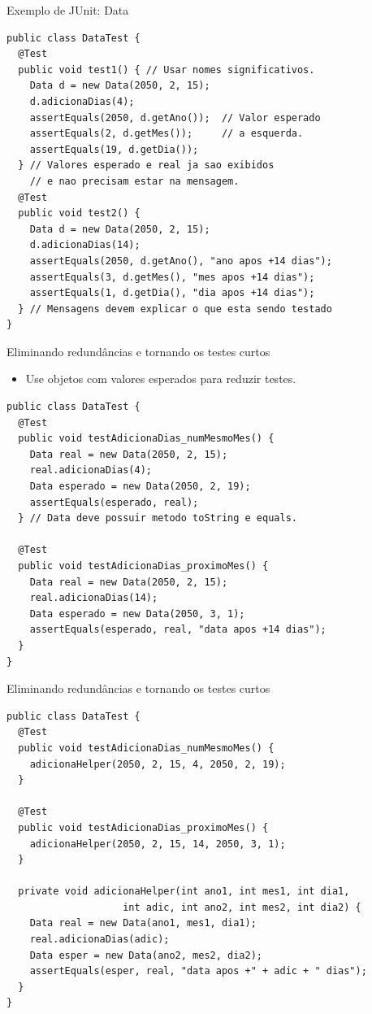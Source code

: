 \documentclass[handout]{beamer}
\begin{document}
\begin{frame}[fragile]{Exemplo de JUnit: Data}
\vspace{-2mm}
\begin{lstlisting}
public class DataTest {
  @Test
  public void test1() { // Usar nomes significativos.
    Data d = new Data(2050, 2, 15);
    d.adicionaDias(4);
    assertEquals(2050, d.getAno());  // Valor esperado
    assertEquals(2, d.getMes());     // a esquerda.
    assertEquals(19, d.getDia());    
  } // Valores esperado e real ja sao exibidos 
    // e nao precisam estar na mensagem.
  @Test
  public void test2() {
    Data d = new Data(2050, 2, 15);
    d.adicionaDias(14);
    assertEquals(2050, d.getAno(), "ano apos +14 dias");
    assertEquals(3, d.getMes(), "mes apos +14 dias");
    assertEquals(1, d.getDia(), "dia apos +14 dias");
  } // Mensagens devem explicar o que esta sendo testado
}
\end{lstlisting}

\end{frame}


\begin{frame}[fragile]{Eliminando redundâncias e tornando os testes curtos}

\begin{itemize}
\item Use objetos com valores esperados para reduzir testes.
\end{itemize} \vspace{-2mm}

\begin{lstlisting}
public class DataTest {
  @Test
  public void testAdicionaDias_numMesmoMes() {
    Data real = new Data(2050, 2, 15);
    real.adicionaDias(4);
    Data esperado = new Data(2050, 2, 19);
    assertEquals(esperado, real);  
  } // Data deve possuir metodo toString e equals.
  
  @Test                           
  public void testAdicionaDias_proximoMes() {
    Data real = new Data(2050, 2, 15);
    real.adicionaDias(14);
    Data esperado = new Data(2050, 3, 1);
    assertEquals(esperado, real, "data apos +14 dias");
  }
}
\end{lstlisting}

\end{frame}

\begin{frame}[fragile]{Eliminando redundâncias e tornando os testes curtos}
\vspace{-2mm}
\begin{lstlisting}
public class DataTest {
  @Test
  public void testAdicionaDias_numMesmoMes() {
    adicionaHelper(2050, 2, 15, 4, 2050, 2, 19);
  } 
  
  @Test
  public void testAdicionaDias_proximoMes() {
    adicionaHelper(2050, 2, 15, 14, 2050, 3, 1);
  }
  
  private void adicionaHelper(int ano1, int mes1, int dia1,
                    int adic, int ano2, int mes2, int dia2) {
    Data real = new Data(ano1, mes1, dia1);
    real.adicionaDias(adic);
    Data esper = new Data(ano2, mes2, dia2);
    assertEquals(esper, real, "data apos +" + adic + " dias");
  }
}
\end{lstlisting}

\end{frame}
\end{document}
